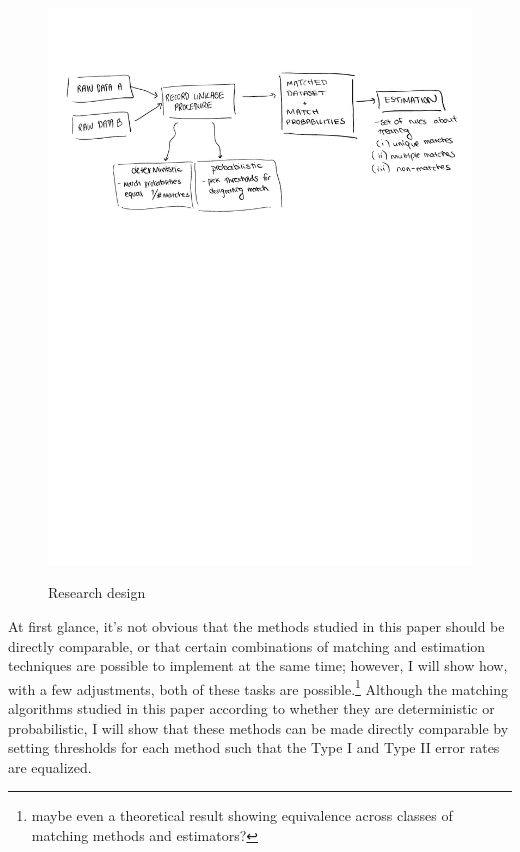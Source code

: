 \documentclass[12pt]{article}
\begin{document}
\begin{figure}[htbp]
\begin{center}
\caption{Research design}
\includegraphics[width=\textwidth]{./Figures/fig1.pdf}
\label{design}
\end{center}
\end{figure}

At first glance, it's not obvious that the methods studied in this paper should be directly comparable, or that certain combinations of matching and estimation techniques are possible to implement at the same time; however, I will show how, with a few adjustments, both of these tasks are possible.\footnote{maybe even a theoretical result showing equivalence across classes of matching methods and estimators?}  Although the matching algorithms studied in this paper according to whether they are deterministic or probabilistic, I will show that these methods can be made directly comparable by setting  thresholds for each method such that the Type I and Type II error rates are equalized.   
\end{document}
